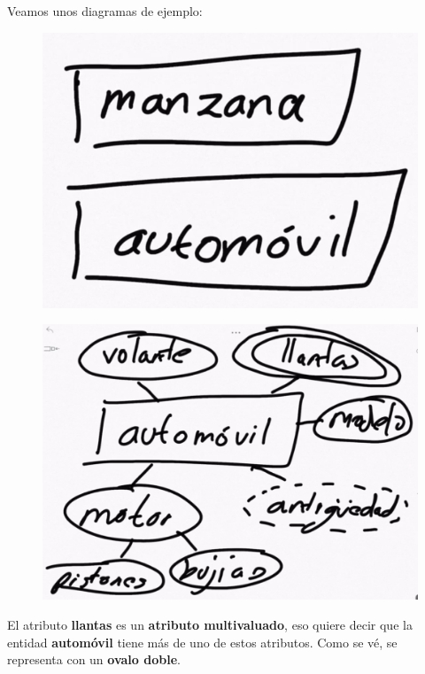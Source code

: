 \documentclass{article}
\begin{document}
\newpage
Veamos unos diagramas de ejemplo:
\begin{figure}[h!]
    \centering
      \includegraphics[scale=0.5]{./Pictures/001_entidades.png}
\end{figure}

\begin{figure}[h!]
    \centering
      \includegraphics[scale=0.5]{./Pictures/002_Diagrama.png}
\end{figure}

El atributo \textbf{llantas} es un \textbf{atributo multivaluado}, eso quiere
decir que la entidad \textbf{automóvil} tiene más de uno de estos atributos.
Como se vé, se representa con un \textbf{ovalo doble}.\\
\end{document}
